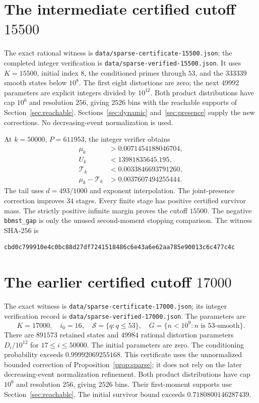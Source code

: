 \documentclass[11pt]{article}
\begin{document}
\section{The intermediate certified cutoff $15500$}\label{sec:15500}
The exact rational witness is \texttt{data/sparse-certificate-15500.json};
the completed integer verification is \texttt{data/sparse-verified-15500.json}.
It uses $K=15500$, initial index $8$, the conditioned primes through $53$,
and the $333339$ smooth states below $10^8$. The first eight distortions
are zero; the next $49992$ parameters are explicit integers divided by
$10^{12}$. Both product distributions have cap $10^6$ and resolution $256$,
giving $2526$ bins with the reachable supports of Section~\ref{sec:reachable}.
Sections~\ref{sec:dynamic} and~\ref{sec:presence} supply the new corrections.
No decreasing-event normalization is used.

At $k=50000$, $P=611953$, the integer verifier obtains
\begin{align*}
 \mu_k&>0.0071454188046704,\\
 U_k&<13981835645.195,\\
 \mathcal T_k&<0.0033846693791260,\\
 \mu_k-\mathcal T_k&>0.0037607494255444.
\end{align*}
The tail uses $d=493/1000$ and exponent interpolation. The joint-presence
correction improves $34$ stages. Every finite stage has positive certified
survivor mass. The strictly positive infinite margin proves
the cutoff $15500$. The negative \texttt{bbmst\_gap} is only the
unused second-moment stopping comparison.
The witness SHA-256 is
\begin{lstlisting}[basicstyle=\ttfamily\scriptsize,breaklines=true]
cbd0c799910e4c0bc88d27df7241518486c6e43a6e62aa785e90013c6c477c4c
\end{lstlisting}

\section{The earlier certified cutoff $17000$}\label{sec:17000}
The exact witness is \texttt{data/sparse-certificate-17000.json}; its
integer verification record is \texttt{data/sparse-verified-17000.json}.
The parameters are
\[
 K=17000,\quad i_0=16,\quad \mathcal S=\{q:q\leq53\},\quad
 G=\{n<10^9:n\text{ is }53\text{-smooth}\}.
\]
There are $891573$ retained states and $49984$ rational distortion
parameters $D_i/10^{12}$ for $17\leq i\leq50000$. The initial parameters
are zero. The conditioning probability exceeds $0.99992069255168$.
This certificate uses the unnormalized bounded correction of
Proposition~\ref{prop:sparse}; it does not rely on the later decreasing-event
normalization refinement. Both product distributions have cap $10^6$ and
resolution $256$, giving $2526$ bins. Their first-moment supports use
Section~\ref{sec:reachable}. The initial survivor bound exceeds
$0.7180800146287439$.
\end{document}
